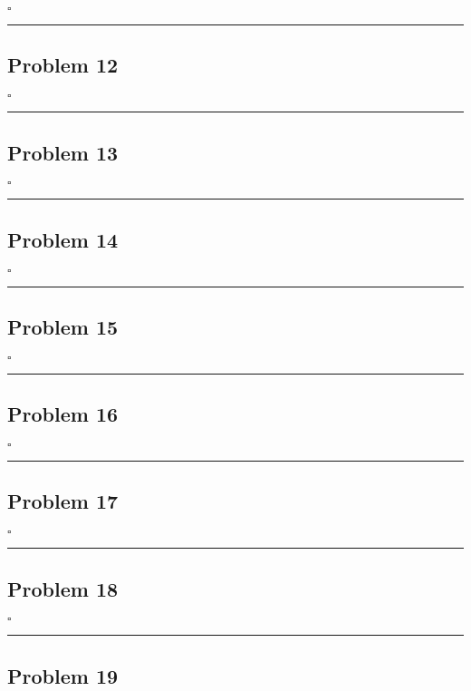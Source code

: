 \documentclass[12pt]{article}
\newcommand*{\QEDB}{\hfill\ensuremath{\square}}
\newcommand{\horrule}[1]{\rule{\linewidth}{#1}}
\begin{document}
\QEDB

\horrule{0.5pt}

\subsection*{Problem 12}

\QEDB

\horrule{0.5pt}

\subsection*{Problem 13}

\QEDB

\horrule{0.5pt}

\subsection*{Problem 14}

\QEDB

\horrule{0.5pt}

\subsection*{Problem 15}

\QEDB

\horrule{0.5pt}

\subsection*{Problem 16}

\QEDB

\horrule{0.5pt}

\subsection*{Problem 17}

\QEDB

\horrule{0.5pt}

\subsection*{Problem 18}

\QEDB

\horrule{0.5pt}

\subsection*{Problem 19}
\end{document}
